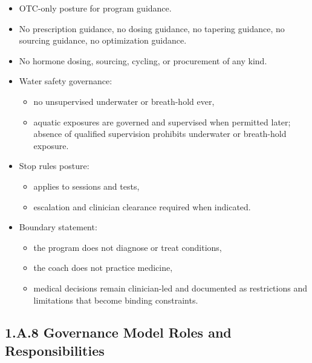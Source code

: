 \documentclass[10pt]{article}
\begin{document}
\begin{itemize}
\item OTC-only posture for program guidance.
\item No prescription guidance, no dosing guidance, no tapering guidance, no sourcing guidance, no optimization guidance.
\item No hormone dosing, sourcing, cycling, or procurement of any kind.
\item Water safety governance:

\begin{itemize}
\item no unsupervised underwater or breath-hold ever,
\item aquatic exposures are governed and supervised when permitted later; absence of qualified supervision prohibits underwater or breath-hold exposure.
\end{itemize}

\item Stop rules posture:

\begin{itemize}
\item applies to sessions and tests,
\item escalation and clinician clearance required when indicated.
\end{itemize}

\item Boundary statement:

\begin{itemize}
\item the program does not diagnose or treat conditions,
\item the coach does not practice medicine,
\item medical decisions remain clinician-led and documented as restrictions and limitations that become binding constraints.
\end{itemize}
\end{itemize}

\subsection*{1.A.8 Governance Model Roles and Responsibilities}
{}

\begingroup
\scriptsize
\setlength{\tabcolsep}{2pt}
\renewcommand{\arraystretch}{1.12}
\end{document}
